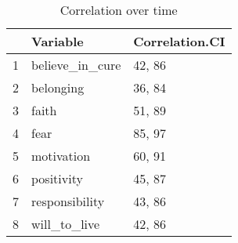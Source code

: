 \begin{table}[ht]
\centering
\begin{tabular}{|r|l|l|}
  \hline
 & Variable & Correlation.CI \\
  \hline
1 & believe\_in\_cure & 42, 86 \\
  2 & belonging & 36, 84 \\
  3 & faith & 51, 89 \\
  4 & fear & 85, 97 \\
  5 & motivation & 60, 91 \\
  6 & positivity & 45, 87 \\
  7 & responsibility & 43, 86 \\ 
  8 & will\_to\_live & 42, 86 \\
   \hline
\end{tabular}
\caption{Correlation over time}
\label{correlation_over_time}
\end{table}
